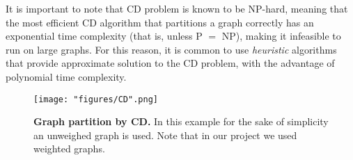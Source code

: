 It is important to note that \acrshort{CD} problem is known to be \textsc{NP}-hard\cite{Fortunato_2010}, meaning that the most efficient \acrshort{CD} algorithm that partitions a graph correctly has an exponential time complexity (that is, unless \textsc{P} $=$ \textsc{NP}), making it infeasible to run on large graphs. For this reason, it is common to use \textit{heuristic} algorithms that provide approximate solution to the \acrshort{CD} problem, with the advantage of polynomial time complexity.

\begin{figure}[h]
  \centering
  \texttt{[image: "figures/CD".png]}
  \caption{\textbf{Graph partition by \acrlong{CD}.} In this example for the sake of simplicity an unweighed graph is used. Note that in our project we used weighted graphs.}
  \label{fig:CD}
\end{figure}

